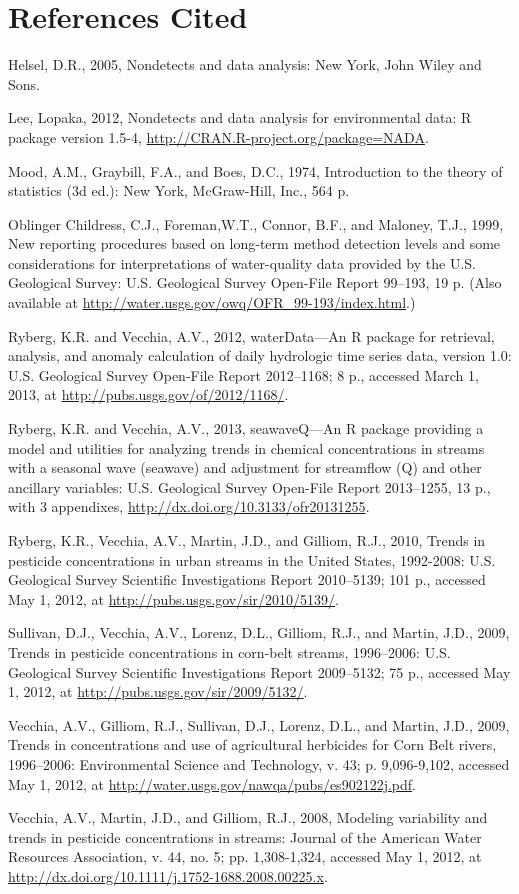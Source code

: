 \documentclass[11pt]{article}
\begin{document}
\section{References Cited}
Helsel, D.R., 2005, Nondetects and data analysis: New York, John Wiley and Sons.

Lee, Lopaka, 2012, Nondetects and data analysis for environmental data: R package version 1.5-4,
\url{http://CRAN.R-project.org/package=NADA}.

Mood, A.M., Graybill, F.A., and Boes, D.C., 1974, Introduction to the theory of statistics (3d ed.): New York, McGraw-Hill, Inc., 564 p.

Oblinger Childress, C.J., Foreman,W.T., Connor, B.F., and Maloney, T.J., 1999, New reporting procedures based on long-term method detection levels and some considerations for interpretations of water-quality data provided by the U.S. Geological Survey: U.S. Geological Survey Open-File Report 99--193, 19 p. (Also available at \url{http://water.usgs.gov/owq/OFR_99-193/index.html}.)

Ryberg, K.R. and Vecchia, A.V., 2012, waterData---An R package for retrieval, analysis, and anomaly calculation of daily hydrologic time series data, version 1.0: U.S. Geological Survey Open-File Report 2012--1168; 8 p., accessed March 1, 2013, at \url{http://pubs.usgs.gov/of/2012/1168/}.

Ryberg, K.R. and Vecchia, A.V., 2013, seawaveQ---An R package providing a model and utilities for analyzing trends in chemical concentrations in streams with a seasonal wave (seawave) and adjustment for streamflow (Q) and other ancillary variables: U.S. Geological Survey Open-File Report 2013--1255, 13 p., with 3 appendixes, \url{http://dx.doi.org/10.3133/ofr20131255}. 

Ryberg, K.R., Vecchia, A.V., Martin, J.D., and Gilliom, R.J., 2010, Trends in pesticide concentrations in urban streams in the United States, 1992-2008: U.S. Geological Survey Scientific Investigations Report 2010--5139; 101 p.,  accessed May 1, 2012, at \url{http://pubs.usgs.gov/sir/2010/5139/}.

Sullivan, D.J., Vecchia, A.V., Lorenz, D.L., Gilliom, R.J., and Martin, J.D., 2009, Trends in pesticide concentrations in corn-belt streams, 1996--2006: U.S. Geological Survey Scientific Investigations Report 2009--5132; 75 p.,  accessed May 1, 2012, at \url{http://pubs.usgs.gov/sir/2009/5132/}.

Vecchia, A.V., Gilliom, R.J., Sullivan, D.J., Lorenz, D.L., and Martin, J.D., 2009, Trends in concentrations and use of agricultural herbicides for Corn Belt rivers, 1996--2006:  Environmental Science and Technology, v. 43; p. 9,096-9,102, accessed May 1, 2012, at \url{http://water.usgs.gov/nawqa/pubs/es902122j.pdf}.

Vecchia, A.V., Martin, J.D., and Gilliom, R.J., 2008, Modeling variability and trends in pesticide concentrations in streams: Journal of the American Water Resources Association, v. 44, no. 5; pp. 1,308-1,324, accessed May 1, 2012, at \url{http://dx.doi.org/10.1111/j.1752-1688.2008.00225.x}.
\end{document}
